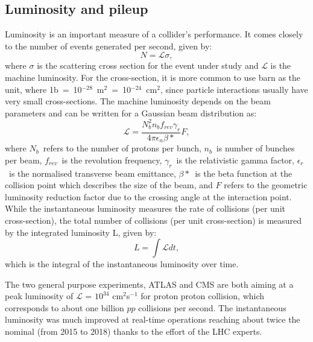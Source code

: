 \subsection{Luminosity and pileup}
Luminosity is an important measure of a collider's performance.
It comes closely to the number of events generated per second, given by:
\[
	N = \mathcal{L}\sigma,
\]
where $\sigma$ is the scattering cross section 
for the event under study and $\mathcal{L}$ is the machine luminosity. 
For the cross-section, it is more common to use barn as the unit, 
where 1b~=~10$^{-28}$~m$^2$~=~10$^{-24}$~cm$^2$, 
since particle interactions usually have very small cross-sections. 
The machine luminosity depends on the beam parameters 
and can be written for a Gaussian beam distribution as:
\[
	\mathcal{L} = \frac{N_b^2 n_b f_{rev} \gamma_r}{4\pi \epsilon_n \beta*} F,
\]
where $N_b$~refers to the number of protons per bunch,
$n_b$~is number of bunches per beam,
$f_{rev}$~is the revolution frequency, 
$\gamma_r$~is the relativistic gamma factor, 
$\epsilon_r$~is the normalised transverse beam emittance, 
$\beta*$~is the beta function at the collision point which
describes the size of the beam, 
and	$F$ refers to the geometric luminosity reduction factor due to the 
crossing angle at the interaction point. 
While the instantaneous luminosity measures the rate of collisions (per unit cross-section), 
the total number of collisions (per unit cross-section) is measured by the integrated luminosity L, 
given by:
\[
	L = \int \mathcal{L} dt,
\]
which is the integral of the instantaneous luminosity over time.

The two general purpose experiments, ATLAS and CMS are
both aiming at a peak luminosity of $\mathcal{L}$ = $10^{34}$ cm$^2$s$^{-1}$ for proton proton collision,
which corresponds to about one billion $pp$ collisions per second. 
The instantaneous luminosity was much improved at real-time operations reaching about 
twice the nominal (from 2015 to 2018) thanks to the effort of the LHC experts. 

